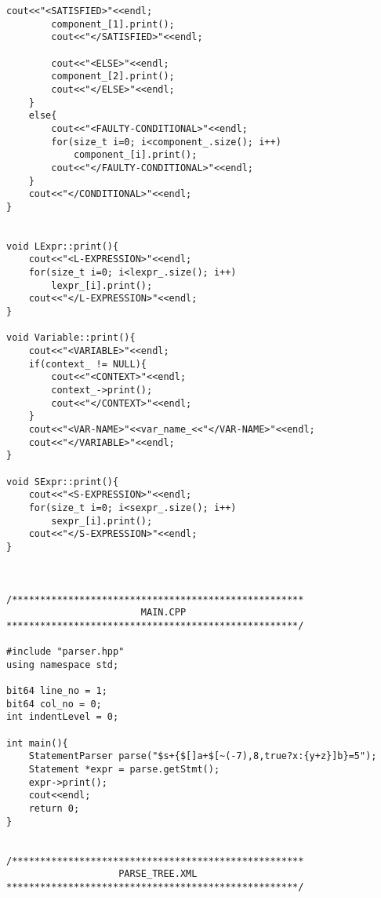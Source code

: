 \documentclass[pdftex,12pt,letterpaper,notitlepage,twoside]{article}
\begin{document}
\begin{lstlisting}[frame=single,caption={C program for testing}]
        cout<<"<SATISFIED>"<<endl;
        component_[1].print();
        cout<<"</SATISFIED>"<<endl;
        
        cout<<"<ELSE>"<<endl;
        component_[2].print();
        cout<<"</ELSE>"<<endl;
    }
    else{
        cout<<"<FAULTY-CONDITIONAL>"<<endl;
        for(size_t i=0; i<component_.size(); i++)
            component_[i].print();  
        cout<<"</FAULTY-CONDITIONAL>"<<endl;
    }
    cout<<"</CONDITIONAL>"<<endl;
}


void LExpr::print(){
    cout<<"<L-EXPRESSION>"<<endl;
    for(size_t i=0; i<lexpr_.size(); i++)
        lexpr_[i].print();
    cout<<"</L-EXPRESSION>"<<endl;
}

void Variable::print(){
    cout<<"<VARIABLE>"<<endl;
    if(context_ != NULL){
        cout<<"<CONTEXT>"<<endl;
        context_->print();
        cout<<"</CONTEXT>"<<endl;
    }
    cout<<"<VAR-NAME>"<<var_name_<<"</VAR-NAME>"<<endl;
    cout<<"</VARIABLE>"<<endl;
}

void SExpr::print(){
    cout<<"<S-EXPRESSION>"<<endl;
    for(size_t i=0; i<sexpr_.size(); i++)
        sexpr_[i].print();
    cout<<"</S-EXPRESSION>"<<endl;
}



/****************************************************
                        MAIN.CPP
****************************************************/

#include "parser.hpp"
using namespace std;

bit64 line_no = 1;
bit64 col_no = 0;
int indentLevel = 0;

int main(){
    StatementParser parse("$s+{$[]a+$[~(-7),8,true?x:{y+z}]b}=5");
    Statement *expr = parse.getStmt();
    expr->print();
    cout<<endl;
    return 0;
}


/****************************************************
                    PARSE_TREE.XML
****************************************************/


\end{lstlisting}
\end{document}
